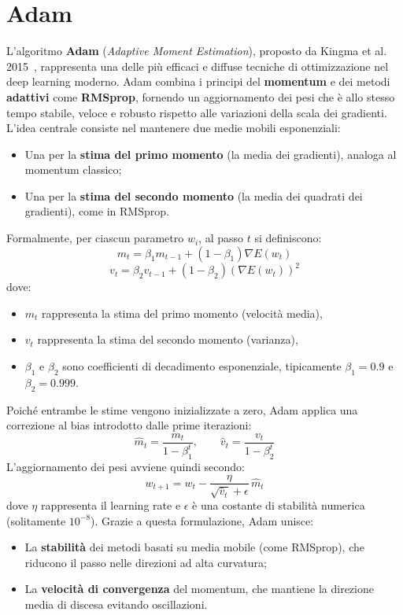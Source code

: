 \section{Adam}

L’algoritmo \textbf{Adam} (\textit{Adaptive Moment Estimation}), proposto da Kingma et al. 2015~\cite{KingmaBa2015Adam}, rappresenta una delle più efficaci e diffuse tecniche di ottimizzazione nel deep learning moderno. Adam combina i principi del \textbf{momentum} e dei metodi \textbf{adattivi} come \textbf{RMSprop}, fornendo un aggiornamento dei pesi che è allo stesso tempo stabile, veloce e robusto rispetto alle variazioni della scala dei gradienti. L’idea centrale consiste nel mantenere due medie mobili esponenziali:
\begin{itemize}
    \item Una per la \textbf{stima del primo momento} (la media dei gradienti), analoga al momentum classico;
    \item Una per la \textbf{stima del secondo momento} (la media dei quadrati dei gradienti), come in RMSprop.
\end{itemize}

Formalmente, per ciascun parametro $w_i$, al passo $t$ si definiscono:
\[
m_t = \beta_1 m_{t-1} + (1 - \beta_1) \nabla E(w_t)
\]
\[
v_t = \beta_2 v_{t-1} + (1 - \beta_2) (\nabla E(w_t))^2
\]
dove:
\begin{itemize}
    \item $m_t$ rappresenta la stima del primo momento (velocità media),
    \item $v_t$ rappresenta la stima del secondo momento (varianza),
    \item $\beta_1$ e $\beta_2$ sono coefficienti di decadimento esponenziale, tipicamente $\beta_1 = 0.9$ e $\beta_2 = 0.999$.
\end{itemize}

Poiché entrambe le stime vengono inizializzate a zero, Adam applica una correzione al bias introdotto dalle prime iterazioni:
\[
\hat{m}_t = \frac{m_t}{1 - \beta_1^t}, \qquad
\hat{v}_t = \frac{v_t}{1 - \beta_2^t}
\]
L’aggiornamento dei pesi avviene quindi secondo:
\[
w_{t+1} = w_t - \frac{\eta}{\sqrt{\hat{v}_t} + \epsilon} \, \hat{m}_t
\]
dove $\eta$ rappresenta il learning rate e $\epsilon$ è una costante di stabilità numerica (solitamente $10^{-8}$). Grazie a questa formulazione, Adam unisce:
\begin{itemize}
    \item La \textbf{stabilità} dei metodi basati su media mobile (come RMSprop), che riducono il passo nelle direzioni ad alta curvatura;
    \item La \textbf{velocità di convergenza} del momentum, che mantiene la direzione media di discesa evitando oscillazioni.
\end{itemize}

